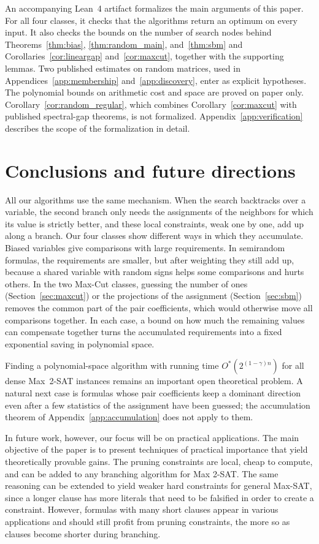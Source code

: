 \documentclass[11pt,a4paper]{article}
\theoremstyle{definition}
\theoremstyle{remark}
\newcommand{\Ostar}{O^{*}}
\begin{document}
An accompanying Lean~4 artifact formalizes the main arguments of this
paper. For all four classes, it checks that the algorithms return an
optimum on every input. It also checks the bounds on the number of search
nodes behind Theorems~\ref{thm:bias}, \ref{thm:random_main}, and~\ref{thm:sbm}
and Corollaries~\ref{cor:lineargap} and~\ref{cor:maxcut}, together with the
supporting lemmas. Two published estimates on random matrices, used in
Appendices~\ref{app:membership} and~\ref{app:discovery}, enter as explicit
hypotheses. The polynomial bounds on arithmetic cost and space are proved
on paper only. Corollary~\ref{cor:random_regular},
which combines Corollary~\ref{cor:maxcut} with published spectral-gap
theorems, is not formalized. Appendix~\ref{app:verification} describes the
scope of the formalization in detail.

\section{Conclusions and future directions}

All our algorithms use the same mechanism. When the search backtracks over
a variable, the second branch only needs the assignments of the neighbors
for which its value is strictly better, and these local constraints, weak
one by one, add up along a branch. Our four classes show different ways in
which they accumulate. Biased variables give comparisons with large
requirements. In semirandom formulas, the requirements are smaller, but
after weighting they still add up, because a shared variable with random signs helps some comparisons
and hurts others. In the two Max-Cut classes, guessing the number of ones
(Section~\ref{sec:maxcut}) or the projections of the assignment
(Section~\ref{sec:sbm}) removes the common part of the pair coefficients,
which would otherwise move all comparisons together. In each case, a bound
on how much the remaining values can compensate together turns the
accumulated requirements into a fixed exponential saving in polynomial
space.

Finding a polynomial-space algorithm with running time
$\Ostar(2^{(1-\gamma)n})$ for all dense \mbox{Max 2-SAT} instances remains an
important open theoretical problem. A natural next case is formulas whose
pair coefficients keep a dominant direction even after a few statistics of
the assignment have been guessed; the accumulation theorem of
Appendix~\ref{app:accumulation} does not apply to them. 

In future work,
however, our focus will be on practical applications.
The main objective of the paper is to present techniques of practical
importance that yield theoretically provable gains. The pruning constraints are local, cheap to compute, and can be
added to any branching algorithm for Max 2-SAT. The same reasoning can be extended to yield weaker hard
constraints for general Max-SAT, since a longer clause has more literals that need to be falsified in order to create a constraint. 
However, formulas with many short clauses appear in various applications and should still profit from pruning constraints, the more
so as clauses become shorter during branching.
\end{document}
